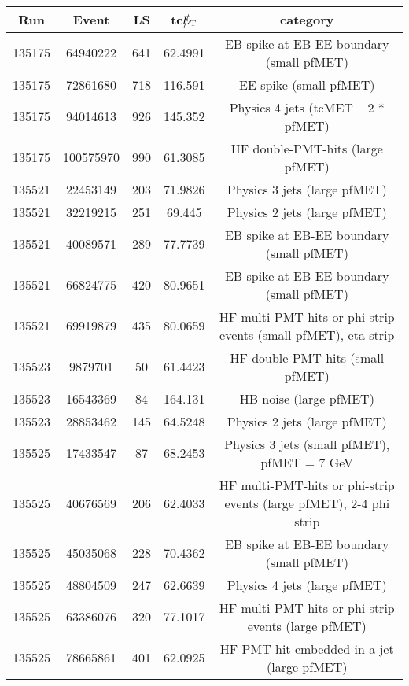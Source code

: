 \begin{table}[htbp]
  \begin{center}
    \begin{tabular}{|c|c|c|c|c|}
      \hline
      Run & Event & LS & tc$\big\slash\hspace{-1.6ex}{E_\text{T}}$ & category \\     
      \hline
      135175  & 64940222     & 641  &    62.4991 & EB spike at EB-EE boundary (small pfMET) \\
      135175  & 72861680     & 718  &    116.591 & EE spike (small pfMET) \\
      135175  & 94014613     & 926  &    145.352 & Physics 4 jets (tcMET ~ 2 * pfMET) \\
      135175  & 100575970    & 990  &    61.3085 & HF double-PMT-hits (large pfMET) \\
      135521  & 22453149     & 203  &    71.9826 & Physics 3 jets (large pfMET) \\
      135521  & 32219215     & 251  &    69.445  & Physics 2 jets (large pfMET) \\
      135521  & 40089571     & 289  &    77.7739 & EB spike at EB-EE boundary (small pfMET) \\
      135521  & 66824775     & 420  &    80.9651 & EB spike at EB-EE boundary (small pfMET) \\
      135521  & 69919879     & 435  &    80.0659 & HF multi-PMT-hits or phi-strip events (small pfMET), eta strip \\
      135523  & 9879701      & 50   &    61.4423 & HF double-PMT-hits (small pfMET) \\
      135523  & 16543369     & 84   &    164.131 & HB noise (large pfMET) \\
      135523  & 28853462     & 145  &    64.5248 & Physics 2 jets (large pfMET) \\
      135525  & 17433547     & 87   &    68.2453 & Physics 3 jets (small pfMET), pfMET = 7 GeV \\ 
      135525  & 40676569     & 206  &    62.4033 & HF multi-PMT-hits or phi-strip events (large pfMET), 2-4 phi strip \\
      135525  & 45035068     & 228  &    70.4362 & EB spike at EB-EE boundary (small pfMET) \\
      135525  & 48804509     & 247  &    62.6639 & Physics 4 jets (large pfMET) \\
      135525  & 63386076     & 320  &    77.1017 & HF multi-PMT-hits or phi-strip events (large pfMET) \\
      135525  & 78665861     & 401  &    62.0925 & HF PMT hit embedded in a jet (large pfMET) \\

\end{tabular}
\end{center}
\end{table}
